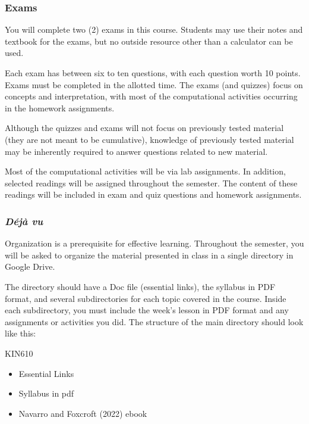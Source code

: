 \documentclass[
  letterpaper,
  DIV=11,
  numbers=noendperiod]{scrartcl}
\providecommand{\tightlist}{%
  \setlength{\itemsep}{0pt}\setlength{\parskip}{0pt}}\usepackage{longtable,booktabs,array}
\begin{document}
\hypertarget{sec-exams}{%
\subsubsection{Exams}\label{sec-exams}}

You will complete two (2) exams in this course. Students may use their
notes and textbook for the exams, but no outside resource other than a
calculator can be used.

Each exam has between six to ten questions, with each question worth 10
points. Exams must be completed in the allotted time. The exams (and
quizzes) focus on concepts and interpretation, with most of the
computational activities occurring in the homework assignments.

Although the quizzes and exams will not focus on previously tested
material (they are not meant to be cumulative), knowledge of previously
tested material may be inherently required to answer questions related
to new material.

Most of the computational activities will be via lab assignments. In
addition, selected readings will be assigned throughout the semester.
The content of these readings will be included in exam and quiz
questions and homework assignments.

\hypertarget{sec-duxe9juxe0-vu}{%
\subsubsection{\texorpdfstring{\emph{Déjà
vu}}{Déjà vu}}\label{sec-duxe9juxe0-vu}}

Organization is a prerequisite for effective learning. Throughout the
semester, you will be asked to organize the material presented in class
in a single directory in Google Drive.

The directory should have a Doc file (essential links), the syllabus in
PDF format, and several subdirectories for each topic covered in the
course. Inside each subdirectory, you must include the week's lesson in
PDF format and any assignments or activities you did. The structure of
the main directory should look like this:

KIN610

\begin{itemize}
\tightlist
\item
  Essential Links
\item
  Syllabus in pdf
\item
  Navarro and Foxcroft (2022) ebook
\end{itemize}
\end{document}
